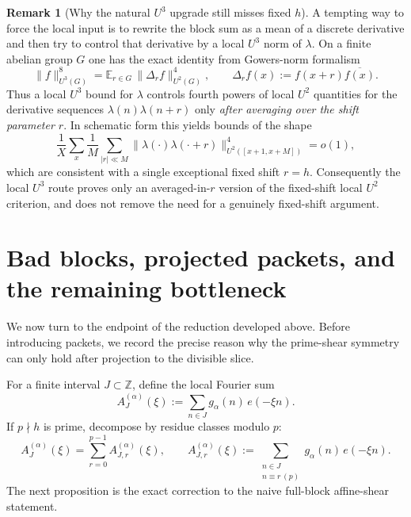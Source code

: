 \documentclass[11pt]{scrartcl}
\numberwithin{equation}{section}
\theoremstyle{definition}
\newtheorem{remark}[theorem]{Remark}
\newcommand{\Z}{\mathbb Z}
\newcommand{\1}{\mathbf 1}
\newcommand{\ee}[1]{e\!\left(#1\right)}
\begin{document}
\begin{remark}[Why the natural $U^3$ upgrade still misses fixed $h$]
A tempting way to force the local input is to rewrite the block sum as a mean of a discrete derivative and then try to control that derivative by a local $U^3$ norm of $\lambda$. On a finite abelian group $G$ one has the exact identity from Gowers-norm formalism \cite{gowers2001szemeredi,taovu2006additive}
\begin{equation}
\label{eq:u3-derivative-identity}
\|f\|_{U^3(G)}^8 = \mathbb E_{r\in G}\,\|\Delta_r f\|_{U^2(G)}^4,
\qquad
\Delta_r f(x):=f(x+r)\overline{f(x)}.
\end{equation}
Thus a local $U^3$ bound for $\lambda$ controls fourth powers of local $U^2$ quantities for the derivative sequences $\lambda(n)\lambda(n+r)$ only \emph{after averaging over the shift parameter $r$}. In schematic form this yields bounds of the shape
\begin{equation}
\label{eq:schematic-averaged-r-u2}
\frac1X\sum_x\frac1M\sum_{|r|\ll M}
\|\lambda(\cdot)\lambda(\cdot+r)\|_{U^2([x+1,x+M])}^4=o(1),
\end{equation}
which are consistent with a single exceptional fixed shift $r=h$. Consequently the local $U^3$ route proves only an averaged-in-$r$ version of the fixed-shift local $U^2$ criterion, and does not remove the need for a genuinely fixed-shift argument.
\end{remark}

\section{Bad blocks, projected packets, and the remaining bottleneck}
\label{sec:projected-packets}

We now turn to the endpoint of the reduction developed above. Before introducing packets, we record the precise reason why the prime-shear symmetry can only hold after projection to the divisible slice.

For a finite interval $J\subset \Z$, define the local Fourier sum
\[
A_J^{(\alpha)}(\xi):=\sum_{n\in J} g_\alpha(n)\,\ee{-\xi n}.
\]
If $p\nmid h$ is prime, decompose by residue classes modulo $p$:
\[
A_J^{(\alpha)}(\xi)=\sum_{r=0}^{p-1}A_{J,r}^{(\alpha)}(\xi),
\qquad
A_{J,r}^{(\alpha)}(\xi):=\sum_{\substack{n\in J\\ n\equiv r\, (p)}} g_\alpha(n)\,\ee{-\xi n}.
\]
The next proposition is the exact correction to the naive full-block affine-shear statement.
\end{document}
